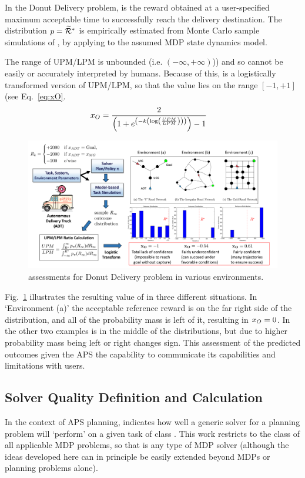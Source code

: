 In the Donut Delivery problem, \riref{} is the reward obtained at a user-specified maximum acceptable time to successfully reach the delivery destination. The distribution $p = \widetilde{\mathcal{R}}^*$ is empirically estimated from Monte Carlo sample simulations of \rwdopt, by applying \piopt{} to the assumed MDP state dynamics model.

The range of UPM/LPM is unbounded (i.e. $(-\infty,+\infty)$)) and so cannot be easily or accurately interpreted by humans. Because of this, \xO{} is a logistically transformed version of UPM/LPM, so that the value lies on the range $[-1,+1]$ (see Eq.~\ref{eq:xO}.
    \begin{align}
        \xO &= \frac{2}{\left(1+e^{\left(-k\left(\log\left(\frac{UPM}{LPM}\right)\right)\right)}\right) - 1} \label{eq:xO}
    \end{align}
    \begin{figure}[tbp]
        \centering
        \includegraphics[width=0.95\linewidth]{Figures/xO_FullADT.png}
        \caption{\xO{} assessments for Donut Delivery problem in various environments. }
        \label{fig:xOexample}
    \end{figure}

Fig.~\ref{fig:xOexample} illustrates the resulting value of \xO{} in three different situations. In `Environment (a)' the acceptable reference reward \ris{} is on the far right side of the distribution, and all of the probability mass is left of it, resulting in $x_O=0$. In the other two examples \ris{} is in the middle of the distributions, but due to higher probability mass being left or right \xO{} changes sign. This assessment of the predicted outcomes given the APS the capability to communicate its capabilities and limitations with users.

\subsection{Solver Quality Definition and Calculation} \label{sec:xQ}
In the context of APS planning, \xQ{} indicates how well a generic solver \solve{} for a planning problem will `perform' on a given task \task{} of class \taskclass{}. This work restricts \taskclass{} to the class of all applicable MDP problems, so that \solve{} is any type of MDP solver  (although the ideas developed here can in principle be easily extended beyond MDPs or planning problems alone).

